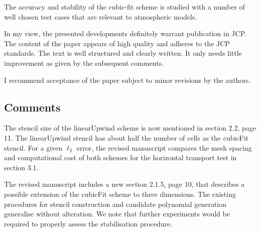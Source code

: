 \documentclass[times]{elsarticle}
\begin{document}
The accuracy and stability of the cubic-fit scheme is studied with a number of well 
chosen test cases that are relevant to atmospheric models. 

In my view, the presented developments definitely warrant publication in JCP. 
The content of the paper appears of high quality and adheres to the JCP standards. 
The text is well structured and clearly written. It only needs little improvement 
as given by the subsequent comments. 

I recommend acceptance of the paper subject to minor revisions by the authors.

\subsection*{Comments}

\begin{quotation}
\begin{comment}
\item  It is explained in various places that the cubic-fit scheme
    offers favourable computational efficiency due to the fact
    that most of the reconstruction depends on the mesh geometry
    only, and this part can be precomputed. It would be very interesting
    to see numbers in the paper. It doesn't have to be a comprehensive
    study, but just to get an impression of the cost, e.g. how does
    the runtime of the cubic-fit compare to the second-order upwind
    scheme? Or, if one runs cubic-fit and the upwind scheme such that
    both produce about the same $\ell_2$ error (by using a higher resolution
    with the upwind scheme), what is then the difference in runtime?
\end{comment}
\end{quotation}
The stencil size of the linearUpwind scheme is now mentioned in section 2.2, page 11.  The linearUpwind stencil has about half the number of cells as the cubicFit stencil.
For a given $\ell_2$ error, the revised manuscript compares the mesh spacing and computational cost of both schemes for the horizontal transport test in section 3.1.

\begin{quotation}
\begin{comment}
\item  As only 2D simulations have been considered in the paper, I
    wondered how difficult it will be to extend the cubic-fit
    scheme to 3D? It could useful to provide a short comment
    about this, just whether complications are anticipated or
    not. (See also the subsequent comment.)
\end{comment}
\end{quotation}
The revised manuscript includes a new section 2.1.5, page 10, that describes a possible extension of the cubicFit scheme to three dimensions.  The existing procedures for stencil construction and candidate polynomial generation generalise without alteration.  We note that further experiments would be required to properly assess the stabilisation procedure.
\end{document}
